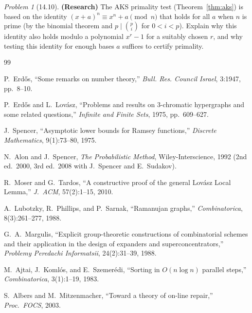 \documentclass[twoside,12pt]{book}
\theoremstyle{plain}
\theoremstyle{definition}
\theoremstyle{remark}
\newtheorem{problem}[theorem]{Problem}
\begin{document}
\begin{problem}[14.10]
\textbf{(Research)} The AKS primality test (Theorem~\ref{thm:aks}) is based on the identity $(x + a)^n \equiv x^n + a \pmod{n}$ that holds for all $a$ when $n$ is prime (by the binomial theorem and $p \mid \binom{p}{i}$ for $0 < i < p$). Explain why this identity also holds modulo a polynomial $x^r - 1$ for a suitably chosen $r$, and why testing this identity for enough bases $a$ suffices to certify primality.
\end{problem}


\begin{thebibliography}{99}

P.~Erd\H{o}s,
``Some remarks on number theory,''
\textit{Bull. Res. Council Israel}, 3:1947, pp.~8--10.

P.~Erd\H{o}s and L.~Lov\'{a}sz,
``Problems and results on $3$-chromatic hypergraphs and some related
questions,''
\textit{Infinite and Finite Sets}, 1975, pp.~609--627.

J.~Spencer,
``Asymptotic lower bounds for Ramsey functions,''
\textit{Discrete Mathematics}, 9(1):73--80, 1975.

N.~Alon and J.~Spencer,
\textit{The Probabilistic Method},
Wiley-Interscience, 1992 (2nd ed.~2000, 3rd ed.~2008 with J.~Spencer and
E.~Sudakov).

R.~Moser and G.~Tardos,
``A constructive proof of the general Lov\'{a}sz Local Lemma,''
\textit{J.~ACM}, 57(2):1--15, 2010.

A.~Lubotzky, R.~Phillips, and P.~Sarnak,
``Ramanujan graphs,''
\textit{Combinatorica}, 8(3):261--277, 1988.

G.~A.~Margulis,
``Explicit group-theoretic constructions of combinatorial schemes and
their application in the design of expanders and superconcentrators,''
\textit{Problemy Peredachi Informatsii}, 24(2):31--39, 1988.

M.~Ajtai, J.~Koml\'{o}s, and E.~Szemer\'{e}di,
``Sorting in $O(n \log n)$ parallel steps,''
\textit{Combinatorica}, 3(1):1--19, 1983.

S.~Albers and M.~Mitzenmacher,
``Toward a theory of on-line repair,''
\textit{Proc.~FOCS}, 2003.


\end{thebibliography}
\end{document}
